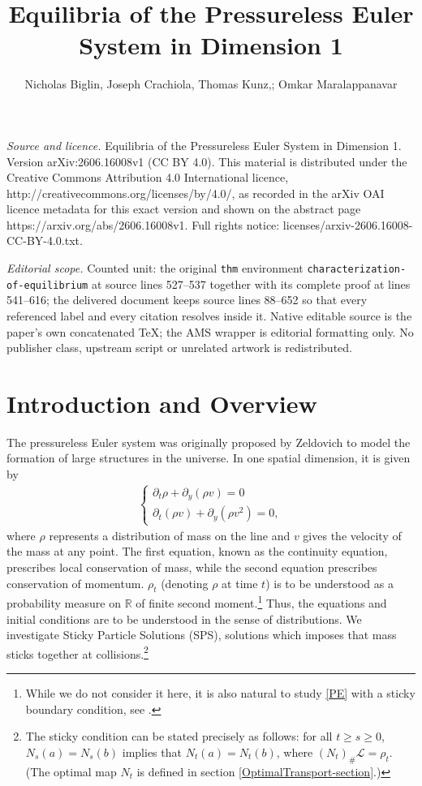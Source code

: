 \documentclass[10pt,a4paper]{amsart}
\numberwithin{equation}{section}
\begin{document}
\title[Equilibria of the Pressureless Euler System in Dimension 1]{Equilibria of the Pressureless Euler System in Dimension 1}
\author{Nicholas Biglin, Joseph Crachiola, Thomas Kunz,; Omkar Maralappanavar}
\date{}
\maketitle
\noindent\emph{Source and licence.} Equilibria of the Pressureless Euler System in Dimension 1. Version arXiv:2606.16008v1 (CC BY 4.0). This material is distributed under the Creative Commons Attribution 4.0 International licence, http://creativecommons.org/licenses/by/4.0/, as recorded in the arXiv OAI licence metadata for this exact version and shown on the abstract page https://arxiv.org/abs/2606.16008v1. Full rights notice: licenses/arxiv-2606.16008-CC-BY-4.0.txt.\par\smallskip
\noindent\textit{Editorial scope.} Counted unit: the original \texttt{thm} environment \texttt{characterization-of-equilibrium} at source lines 527--537 together with its complete proof at lines 541--616; the delivered document keeps source lines 88--652 so that every referenced label and every citation resolves inside it. Native editable source is the paper's own concatenated TeX; the AMS wrapper is editorial formatting only. No publisher class, upstream script or unrelated artwork is redistributed.
\section{Introduction and Overview}\label{Overview}
    The pressureless Euler system was originally proposed by Zeldovich \cite{Zeldovich} to model the formation of large structures in the universe. In one spatial dimension, it is given by 
    \begin{align}
        \begin{cases}\label{PE}\tag{PE}
        \partial_t \rho + \partial_y (\rho v) = 0 
        \\
        \partial_t (\rho v) + \partial_y (\rho v^2) = 0,
        \end{cases}
    \end{align}
    where $\rho$ represents a distribution of mass on the line and $v$ gives the velocity of the mass at any point. The first equation, known as the continuity equation, prescribes local conservation of mass, while the second equation prescribes conservation of momentum. $\rho_t$ (denoting $\rho$ at time $t$) is to be understood as a probability measure on $\mathbb{R}$ of finite second moment.\footnote{While we do not consider it here, it is also natural to study \eqref{PE} with a sticky boundary condition, see \cite{Tudorascu2023}.}
    Thus, the equations and initial conditions are to be understood in the sense of distributions. We investigate Sticky Particle Solutions (SPS), solutions which imposes that mass sticks together at collisions.\footnote{The sticky condition can be stated precisely as follows: for all $t\geq s\geq0$, $N_s(a)=N_s(b)$ implies that $N_t(a)=N_t(b)$, where $(N_t)_\#\mathcal{L}=\rho_t$. (The optimal map $N_t$ is defined in section \ref{OptimalTransport-section}.)}
\end{document}
